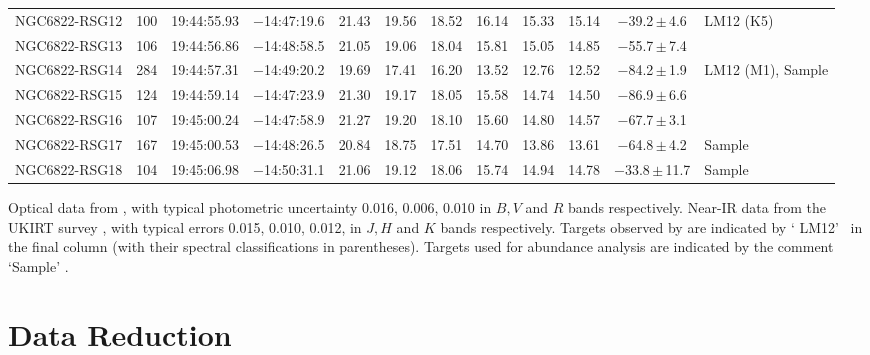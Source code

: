 \begin{table}
\begin{threeparttable}
\begin{tabular}{lrcccccccccl}
NGC6822-RSG12 & 100 &   19:44:55.93  &  $-$14:47:19.6  &  21.43  &  19.56  &  18.52  &  16.14  &  15.33  &  15.14  &  $-$39.2\,$\pm$\,4.6 & LM12 (K5) \\
NGC6822-RSG13 & 106 &   19:44:56.86  &  $-$14:48:58.5  &  21.05  &  19.06  &  18.04  &  15.81  &  15.05  &  14.85  &  $-$55.7\,$\pm$\,7.4 \\
NGC6822-RSG14 & 284 &   19:44:57.31  &  $-$14:49:20.2  &  19.69  &  17.41  &  16.20  &  13.52  &  12.76  &  12.52  &  $-$84.2\,$\pm$\,1.9 & LM12 (M1), Sample \\
NGC6822-RSG15 & 124 &   19:44:59.14  &  $-$14:47:23.9  &  21.30  &  19.17  &  18.05  &  15.58  &  14.74  &  14.50  &  $-$86.9\,$\pm$\,6.6 \\
NGC6822-RSG16 & 107 &   19:45:00.24  &  $-$14:47:58.9  &  21.27  &  19.20  &  18.10  &  15.60  &  14.80  &  14.57  &  $-$67.7\,$\pm$\,3.1 \\
NGC6822-RSG17 & 167 &   19:45:00.53  &  $-$14:48:26.5  &  20.84  &  18.75  &  17.51  &  14.70  &  13.86  &  13.61  &  $-$64.8\,$\pm$\,4.2 & Sample\\
NGC6822-RSG18 & 104 &   19:45:06.98  &  $-$14:50:31.1  &  21.06  &  19.12  &  18.06  &  15.74  &  14.94  &  14.78  &\a$-$33.8\,$\pm$\,11.7& Sample\\
\hline
\end{tabular}

\begin{tablenotes}
  \item Optical data from
  \protect\cite{2007AJ....134.2474M}, with typical photometric uncertainty 0.016, 0.006, 0.010 in $B, V$ and $R$ bands respectively.
  Near-IR data from the UKIRT survey
  \protect\cite[see][for details]{2012A&A...540A.135S}, with typical errors 0.015, 0.010, 0.012, in $J, H$ and $K$ bands respectively.
  Targets observed by
  \protect\cite{2012AJ....144....2L}
  are indicated by \textquoteleft
  LM12\textquoteright~ in the final column (with their spectral classifications in parentheses).
  Targets used for abundance analysis are indicated by the comment
  \textquoteleft Sample\textquoteright
  .
\end{tablenotes}
\end{threeparttable}
\end{table}



\section{Data Reduction} %
\label{sec:ngc6822data_red}

